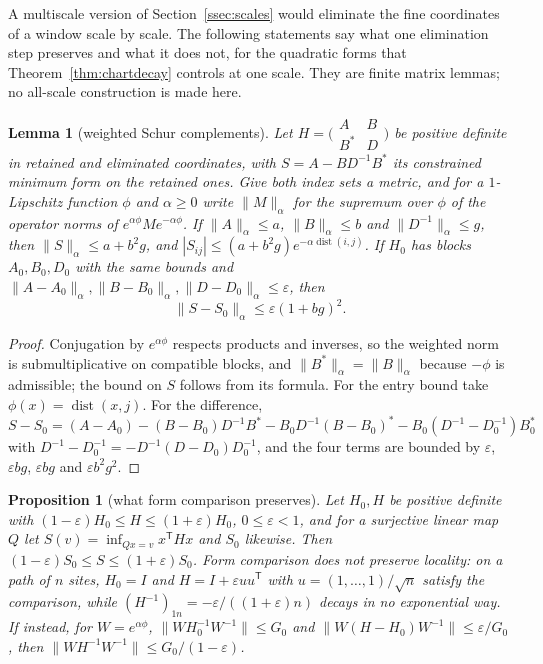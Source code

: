 \documentclass[11pt]{amsart}
\newtheorem{lemma}[theorem]{Lemma}
\newtheorem{proposition}[theorem]{Proposition}
\theoremstyle{definition}
\theoremstyle{remark}
\numberwithin{equation}{section}
\newcommand{\dist}{\operatorname{dist}}
\begin{document}
A multiscale version of Section~\ref{ssec:scales} would eliminate the fine
coordinates of a window scale by scale. The following statements say what
one elimination step preserves and what it does not, for the quadratic
forms that Theorem~\ref{thm:chartdecay} controls at one scale. They are
finite matrix lemmas; no all-scale construction is made here.

\begin{lemma}[weighted Schur complements]\label{lem:schur}
Let $H=\bigl(\begin{smallmatrix}A&B\\B^*&D\end{smallmatrix}\bigr)$ be
positive definite in retained and eliminated coordinates, with
$S=A-BD^{-1}B^*$ its constrained minimum form on the retained ones. Give
both index sets a metric, and for a $1$-Lipschitz function $\phi$ and
$\alpha\ge0$ write $\lVert M\rVert_\alpha$ for the supremum over $\phi$ of
the operator norms of $e^{\alpha\phi}Me^{-\alpha\phi}$. If $\lVert A
\rVert_\alpha\le a$, $\lVert B\rVert_\alpha\le b$ and $\lVert D^{-1}
\rVert_\alpha\le g$, then $\lVert S\rVert_\alpha\le a+b^2g$, and
$|S_{ij}|\le(a+b^2g)e^{-\alpha\dist(i,j)}$. If $H_0$ has blocks $A_0,B_0,
D_0$ with the same bounds and $\lVert A-A_0\rVert_\alpha,\lVert B-B_0
\rVert_\alpha,\lVert D-D_0\rVert_\alpha\le\varepsilon$, then
\[
\lVert S-S_0\rVert_\alpha\le\varepsilon(1+bg)^2 .
\]
\end{lemma}

\begin{proof}
Conjugation by $e^{\alpha\phi}$ respects products and inverses, so the
weighted norm is submultiplicative on compatible blocks, and $\lVert B^*
\rVert_\alpha=\lVert B\rVert_\alpha$ because $-\phi$ is admissible; the
bound on $S$ follows from its formula. For the entry bound take $\phi(x)=
\dist(x,j)$. For the difference,
$S-S_0=(A-A_0)-(B-B_0)D^{-1}B^*-B_0D^{-1}(B-B_0)^*-B_0(D^{-1}-D_0^{-1})
B_0^*$ with $D^{-1}-D_0^{-1}=-D^{-1}(D-D_0)D_0^{-1}$, and the four terms
are bounded by $\varepsilon$, $\varepsilon bg$, $\varepsilon bg$ and
$\varepsilon b^2g^2$.
\end{proof}

\begin{proposition}[what form comparison preserves]\label{prop:formstability}
Let $H_0,H$ be positive definite with $(1-\varepsilon)H_0\le H\le(1+
\varepsilon)H_0$, $0\le\varepsilon<1$, and for a surjective linear map $Q$
let $S(v)=\inf_{Qx=v}x^{\mathsf T}Hx$ and $S_0$ likewise. Then $(1-
\varepsilon)S_0\le S\le(1+\varepsilon)S_0$. Form comparison does not
preserve locality: on a path of $n$ sites, $H_0=I$ and $H=I+\varepsilon
uu^{\mathsf T}$ with $u=(1,\dots,1)/\sqrt n$ satisfy the comparison, while
$(H^{-1})_{1n}=-\varepsilon/((1+\varepsilon)n)$ decays in no exponential
way. If instead, for $W=e^{\alpha\phi}$, $\lVert WH_0^{-1}W^{-1}\rVert\le
G_0$ and $\lVert W(H-H_0)W^{-1}\rVert\le\varepsilon/G_0$, then $\lVert
WH^{-1}W^{-1}\rVert\le G_0/(1-\varepsilon)$.
\end{proposition}
\end{document}
